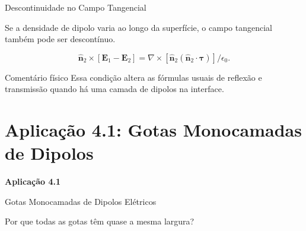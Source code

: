 \documentclass[aspectratio=169]{beamer}
\begin{document}
\begin{frame}{Descontinuidade no Campo Tangencial}

Se a densidade de dipolo varia ao longo da superfície, o campo tangencial também pode ser descontínuo.

\begin{eqbox}
\begin{equation}
\hat{\mathbf n}_2
\times
\left[
\mathbf E_1-\mathbf E_2
\right]
=
\nabla
\times
\left[
\hat{\mathbf n}_2
\left(
\hat{\mathbf n}_2\cdot\boldsymbol{\tau}
\right)
\right]
/
\epsilon_0 .
\tag{4.46}
\label{eq:4.46}
\end{equation}
\end{eqbox}

\begin{mybox}{Comentário físico}
Essa condição altera as fórmulas usuais de reflexão e transmissão quando há uma camada de dipolos na interface.
\end{mybox}

\end{frame}

\section{Aplicação 4.1: Gotas Monocamadas de Dipolos}

\begin{frame}

\vspace{1.8cm}

\begin{center}
{\color{white}\Huge \textbf{Aplicação 4.1}}

\vspace{0.5cm}

{\color{white}\Large Gotas Monocamadas de Dipolos Elétricos}

\vspace{1.0cm}

{\color{white}\large Por que todas as gotas têm quase a mesma largura?}
\end{center}

\end{frame}
\end{document}
